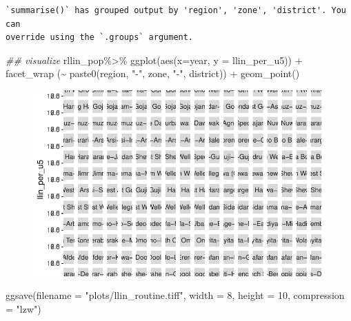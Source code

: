 \documentclass[
  letterpaper,
  DIV=11,
  numbers=noendperiod]{scrreprt}
\newenvironment{Shaded}{\begin{snugshade}}{\end{snugshade}}
\newcommand{\AttributeTok}[1]{\textcolor[rgb]{0.40,0.45,0.13}{#1}}
\newcommand{\DecValTok}[1]{\textcolor[rgb]{0.68,0.00,0.00}{#1}}
\newcommand{\DocumentationTok}[1]{\textcolor[rgb]{0.37,0.37,0.37}{\textit{#1}}}
\newcommand{\FunctionTok}[1]{\textcolor[rgb]{0.28,0.35,0.67}{#1}}
\newcommand{\NormalTok}[1]{\textcolor[rgb]{0.00,0.23,0.31}{#1}}
\newcommand{\SpecialCharTok}[1]{\textcolor[rgb]{0.37,0.37,0.37}{#1}}
\newcommand{\StringTok}[1]{\textcolor[rgb]{0.13,0.47,0.30}{#1}}
\begin{document}
\begin{verbatim}
`summarise()` has grouped output by 'region', 'zone', 'district'. You can
override using the `.groups` argument.
\end{verbatim}

\begin{Shaded}
\begin{Highlighting}[]
\DocumentationTok{\#\# visualize}
\NormalTok{rllin\_pop}\SpecialCharTok{\%\textgreater{}\%} 
  \FunctionTok{ggplot}\NormalTok{(}\FunctionTok{aes}\NormalTok{(}\AttributeTok{x=}\NormalTok{year, }\AttributeTok{y =}\NormalTok{ llin\_per\_u5)) }\SpecialCharTok{+}
  \FunctionTok{facet\_wrap}\NormalTok{ (}\SpecialCharTok{\textasciitilde{}} \FunctionTok{paste0}\NormalTok{(region, }\StringTok{"{-}"}\NormalTok{, zone, }\StringTok{"{-}"}\NormalTok{, district)) }\SpecialCharTok{+}
  \FunctionTok{geom\_point}\NormalTok{()}
\end{Highlighting}
\end{Shaded}

\begin{figure}[H]

{\centering \includegraphics{module_01_files/figure-pdf/unnamed-chunk-6-1.pdf}

}

\end{figure}

\begin{Shaded}
\begin{Highlighting}[]
 \FunctionTok{ggsave}\NormalTok{(}\AttributeTok{filename =} \StringTok{"plots/llin\_routine.tiff"}\NormalTok{,}
       \AttributeTok{width =} \DecValTok{8}\NormalTok{, }\AttributeTok{height =} \DecValTok{10}\NormalTok{, }\AttributeTok{compression =} \StringTok{"lzw"}\NormalTok{) }
\end{Highlighting}
\end{Shaded}
\end{document}
